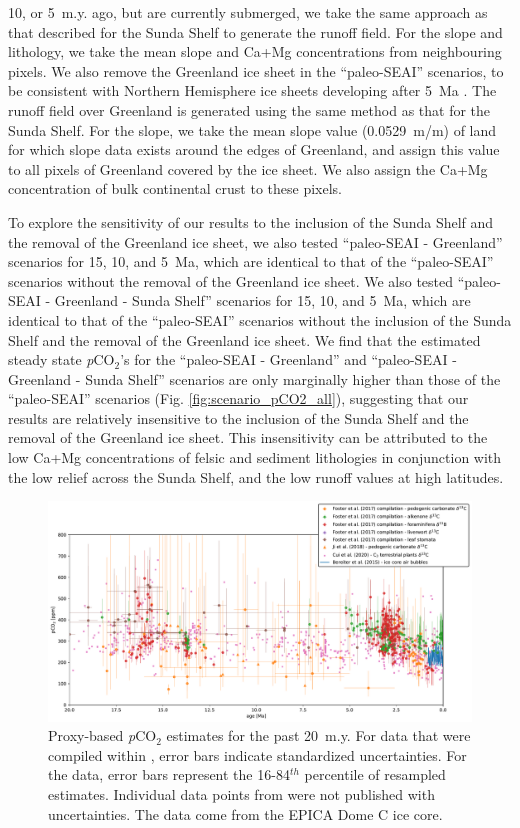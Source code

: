 \documentclass[11pt,letterpaper]{article}
\newcommand{\pCOtwo}{\textit{p}CO$_{2}$\xspace}
\begin{document}
10, or 5~m.y. ago, but are currently submerged, we take the same approach as that described for the Sunda Shelf to generate the runoff field. For the slope and lithology, we take the mean slope and Ca+Mg concentrations from neighbouring pixels. We also remove the Greenland ice sheet in the ``paleo-SEAI'' scenarios, to be consistent with Northern Hemisphere ice sheets developing after 5~Ma \citep{Haug2005a}. The runoff field over Greenland is generated using the same method as that for the Sunda Shelf. For the slope, we take the mean slope value (0.0529~m/m) of land for which slope data exists around the edges of Greenland, and assign this value to all pixels of Greenland covered by the ice sheet. We also assign the Ca+Mg concentration of bulk continental crust to these pixels.

To explore the sensitivity of our results to the inclusion of the Sunda Shelf and the removal of the Greenland ice sheet, we also tested ``paleo-SEAI - Greenland'' scenarios for 15, 10, and 5~Ma, which are identical to that of the ``paleo-SEAI'' scenarios without the removal of the Greenland ice sheet. We also tested ``paleo-SEAI - Greenland - Sunda Shelf'' scenarios for 15, 10, and 5~Ma, which are identical to that of the ``paleo-SEAI'' scenarios without the inclusion of the Sunda Shelf and the removal of the Greenland ice sheet. We find that the estimated steady state \pCOtwo's for the ``paleo-SEAI - Greenland'' and ``paleo-SEAI - Greenland - Sunda Shelf'' scenarios are only marginally higher than those of the ``paleo-SEAI'' scenarios (Fig. \ref{fig:scenario_pCO2_all}), suggesting that our results are relatively insensitive to the inclusion of the Sunda Shelf and the removal of the Greenland ice sheet. This insensitivity can be attributed to the low Ca+Mg concentrations of felsic and sediment lithologies in conjunction with the low relief across the Sunda Shelf, and the low runoff values at high latitudes.

\begin{figure}[h!]
    \centering
    \includegraphics[width=1\textwidth]{Figures/pCO2_proxies.pdf}
    \caption{Proxy-based \pCOtwo estimates for the past 20~m.y. For data that were compiled within \citet{Foster2017a}, error bars indicate standardized uncertainties. For the \citet{Ji2018a} data, error bars represent the 16-84$^{th}$ percentile of resampled estimates. Individual data points from \citet{Cui2020a} were not published with uncertainties. The \citet{Bereiter2015a} data come from the EPICA Dome C ice core.}
    \label{fig:pCO2_proxies}
\end{figure}
\end{document}
